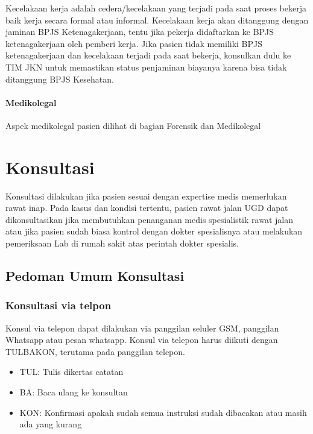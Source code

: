 \documentclass[
]{book}
\providecommand{\tightlist}{%
  \setlength{\itemsep}{0pt}\setlength{\parskip}{0pt}}
\begin{document}
Kecelakaan kerja adalah cedera/kecelakaan yang terjadi pada saat proses bekerja baik kerja secara formal atau informal.
Kecelakaan kerja akan ditanggung dengan jaminan BPJS Ketenagakerjaan, tentu jika pekerja didaftarkan ke BPJS ketenagakerjaan oleh pemberi kerja. Jika pasien tidak memiliki BPJS ketenagakerjaan dan kecelakaan terjadi pada saat bekerja, konsulkan dulu ke TIM JKN untuk memastikan status penjaminan biayanya karena bisa tidak ditanggung BPJS Kesehatan.

\hypertarget{medikolegal}{%
\subsubsection{Medikolegal}\label{medikolegal}}

Aspek medikolegal pasien dilihat di bagian Forensik dan Medikolegal

\hypertarget{konsultasi}{%
\chapter{Konsultasi}\label{konsultasi}}

Konsultasi dilakukan jika pasien sesuai dengan expertise medis memerlukan rawat inap. Pada kasus dan kondisi tertentu, pasien rawat jalan UGD dapat dikonsultasikan jika membutuhkan penanganan medis spesialistik rawat jalan atau jika pasien sudah biasa kontrol dengan dokter spesialisnya atau melakukan pemeriksaan Lab di rumah sakit atas perintah dokter spesialis.

\hypertarget{pedoman-umum-konsultasi}{%
\section{Pedoman Umum Konsultasi}\label{pedoman-umum-konsultasi}}

\hypertarget{konsultasi-via-telpon}{%
\subsection{Konsultasi via telpon}\label{konsultasi-via-telpon}}

Konsul via telepon dapat dilakukan via panggilan seluler GSM, panggilan Whatsapp atau pesan whatsapp.
Konsul via telepon harus diikuti dengan TULBAKON, terutama pada panggilan telepon.

\begin{itemize}
\tightlist
\item
  TUL: Tulis dikertas catatan
\item
  BA: Baca ulang ke konsultan
\item
  KON: Konfirmasi apakah sudah semua instruksi sudah dibacakan atau masih ada yang kurang
\end{itemize}
\end{document}
